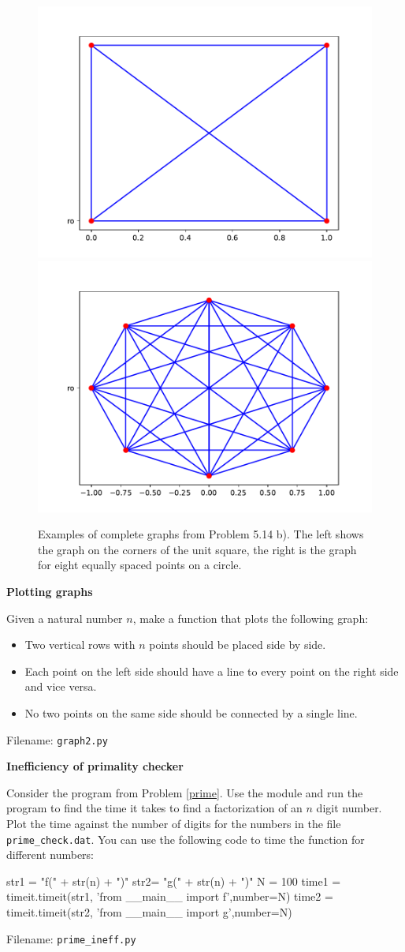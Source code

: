\begin{figure}
    \centerline{
    \includegraphics[width=0.45\linewidth]{./figs/square.pdf}
    \includegraphics[width=0.45\linewidth]{./figs/circle.pdf}}
    \caption{Examples of complete graphs from Problem 5.14 b). The left shows the graph on the
    corners of the unit square, the right is the graph for eight equally spaced points on a circle.}
    \label{fig:graphs}
\end{figure}


\begin{Problem}{\textbf{Plotting graphs}}

\noindent Given a natural number $n$, make a function that plots the following graph:
\begin{itemize}
    \item Two vertical rows with $n$ points should be placed side by side.
    \item Each point on the left side should have a line to every point on the
    right side and vice versa.
    \item No two points on the same side should be connected by a single line.
\end{itemize}
Filename: \texttt{graph2.py}
\end{Problem}


\begin{Problem}{\textbf{Inefficiency of primality checker}}

\noindent Consider the program from Problem \ref{prime}. Use the  module and run the
program to find the time it takes to find a factorization of an $n$ digit number. Plot the time against
the number of digits for the numbers in the file \texttt{prime\_check.dat}.
You can use the following code to time the function for different numbers:
\begin{python}
str1 = "f(" + str(n) + ")"
str2= "g(" + str(n) + ")"
N = 100
time1 = timeit.timeit(str1, 'from __main__ import f',number=N)
time2 = timeit.timeit(str2, 'from __main__ import g',number=N)
\end{python}

Filename: \texttt{prime\_ineff.py}
\end{Problem}

